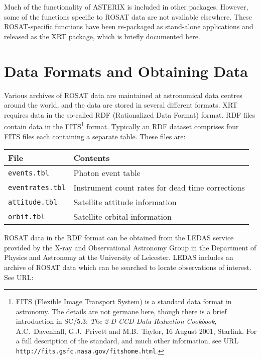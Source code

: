 \documentclass[twoside,11pt]{article}
\newcommand{\htmladdnormallink}[2]{#1}
\newcommand{\xref}[3]{#1}
\newcommand{\xlabel}[1]{}
\renewcommand{\_}{\texttt{\symbol{95}}}
\begin{document}
Much of the functionality of ASTERIX is included in other packages.
However, some of the functions specific to ROSAT data are not available
elsewhere.  These ROSAT-specific functions have been re-packaged as
stand-alone applications and released as the XRT package, which is briefly
documented here.


\section{\xlabel{FORMATS}\label{FORMATS}Data Formats and Obtaining Data}

Various archives of ROSAT data are maintained at astronomical data
centres around the world, and the data are stored in several different
formats.  XRT requires data in the so-called RDF (Rationalized Data
Format) format.  RDF files contain data in the FITS\footnote{FITS (Flexible
Image Transport System) is a standard data format in astronomy.  The
details are not germane here, though there is a
\xref{brief introduction}{sc5}{FITS} in \xref{SC/5.3}{sc5}{}: {\it The
2-D CCD Data Reduction Cookbook}, A.C.~Davenhall, G.J.~Privett and
M.B.~Taylor, 16 August 2001, Starlink.  For a full description of the
standard, and much other information, see URL
\htmladdnormallink{{\tt http://fits.gsfc.nasa.gov/fits\_home.html}}
{http://fits.gsfc.nasa.gov/fits_home.html}.} format.  Typically an RDF
dataset comprises four FITS files each containing a separate table.  These
files are:

\begin{center}
\begin{tabular}{ll}
File                 & Contents \\ \hline
{\tt events.tbl}     & Photon event table \\
{\tt eventrates.tbl} & Instrument count rates for dead time corrections \\
{\tt attitude.tbl}   & Satellite attitude information  \\
{\tt orbit.tbl}      & Satellite orbital information   \\
\end{tabular}
\end{center}

ROSAT data in the RDF format can be obtained from the
\htmladdnormallink{LEDAS}{http://ledas-www.star.le.ac.uk/}
service provided by the
\htmladdnormallink{X-ray and Observational Astronomy Group}
{http://www.star.le.ac.uk/}
in the Department of Physics and Astronomy at the University of Leicester.
LEDAS includes an archive of ROSAT data which can be searched to locate
observations of interest.  See URL:
\end{document}
